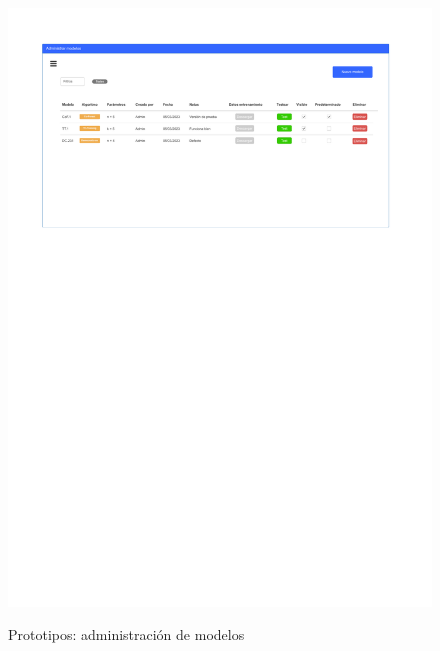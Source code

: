 \begin{figure}[h]
	\caption{Prototipos: administración de modelos}
	\centering
	\includegraphics[width=\textwidth]{../img/anexos/mockups/5-mockups-models}
	\label{mock:model-admin}
\end{figure}

